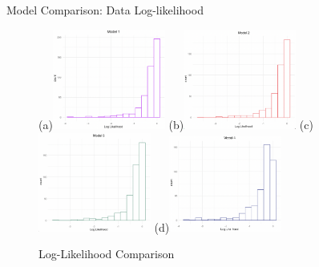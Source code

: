 \documentclass{beamer}
\begin{document}
\begin{frame}{Model Comparison: Data Log-likelihood}
    \begin{figure}[h!]
        \centering
        
        \subfigure(a){\includegraphics[width=0.33\textwidth]{plots/model1_llm.png}} 
        \subfigure(b){\includegraphics[width=0.33\textwidth]{plots/model2_llm.png}} 
        \subfigure(c){\includegraphics[width=0.33\textwidth]{plots/model3_llm.png}}
        \subfigure(d){\includegraphics[width=0.33\textwidth]{plots/model4_llm.png}}
      
        \caption{Log-Likelihood Comparison}
      
   
      \end{figure}  
\end{frame}

        
\end{document}
